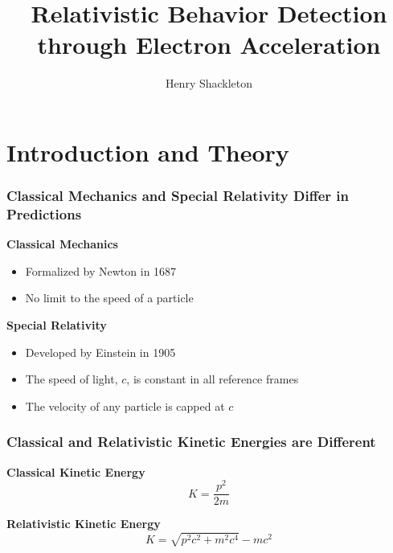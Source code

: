 \documentclass{beamer}
\title[Relativistic Dynamics]{Relativistic Behavior Detection through Electron Acceleration}
\author{Henry Shackleton}
\begin{document}
\titlepage

\section{Introduction and Theory}

\begin{frame}
  \frametitle{Classical Mechanics and Special Relativity Differ in Predictions}
  \textbf{Classical Mechanics}
  \begin{itemize}
    \pause
    \item Formalized by Newton in 1687
      \pause
    \item No limit to the speed of a particle
  \end{itemize}
\pause
  \textbf{Special Relativity}
  \begin{itemize}
    \pause
    \item Developed by Einstein in 1905
      \pause
    \item The speed of light, $c$, is constant in all reference frames
      \pause
    \item The velocity of any particle is capped at $c$
  \end{itemize}
\end{frame}

\begin{frame}
  \frametitle{Classical and Relativistic Kinetic Energies are Different}
  \textbf{Classical Kinetic Energy}
  \begin{equation*}
    K = \frac{p^2}{2m}
  \end{equation*}

  \pause
  \textbf{Relativistic Kinetic Energy}
  \begin{equation*}
    K = \sqrt{p^2 c^2 + m^2 c^4} - mc^2
  \end{equation*}
\end{frame}
\end{document}
